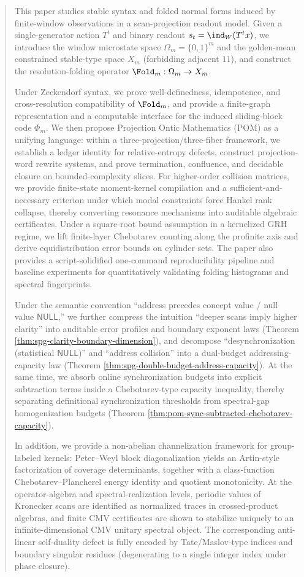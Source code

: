 \begin{abstract}
This paper studies stable syntax and folded normal forms induced by finite-window observations in a scan-projection readout model. Given a single-generator action \(T^t\) and binary readout \(s_t=\ind_W(T^t x)\), we introduce the window microstate space \(\Omega_m=\{0,1\}^m\) and the golden-mean constrained stable-type space \(X_m\) (forbidding adjacent \(11\)), and construct the resolution-folding operator \(\Fold_m:\Omega_m\to X_m\).

Under Zeckendorf syntax, we prove well-definedness, idempotence, and cross-resolution compatibility of \(\Fold_m\), and provide a finite-graph representation and a computable interface for the induced sliding-block code \(\Phi_m\). We then propose Projection Ontic Mathematics (POM) as a unifying language: within a three-projection/three-fiber framework, we establish a ledger identity for relative-entropy defects, construct projection-word rewrite systems, and prove termination, confluence, and decidable closure on bounded-complexity slices. For higher-order collision matrices, we provide finite-state moment-kernel compilation and a sufficient-and-necessary criterion under which modal constraints force Hankel rank collapse, thereby converting resonance mechanisms into auditable algebraic certificates. Under a square-root bound assumption in a kernelized GRH regime, we lift finite-layer Chebotarev counting along the profinite axis and derive equidistribution error bounds on cylinder sets. The paper also provides a script-solidified one-command reproducibility pipeline and baseline experiments for quantitatively validating folding histograms and spectral fingerprints.

Under the semantic convention ``address precedes concept value / null value \(\mathsf{NULL}\),''
we further compress the intuition ``deeper scans imply higher clarity'' into auditable error profiles and boundary exponent laws (Theorem \ref{thm:spg-clarity-boundary-dimension}), and decompose ``desynchronization (statistical \(\mathsf{NULL}\))'' and ``address collision'' into a dual-budget addressing-capacity law (Theorem \ref{thm:spg-double-budget-address-capacity}). At the same time, we absorb online synchronization budgets into explicit subtraction terms inside a Chebotarev-type capacity inequality, thereby separating definitional synchronization thresholds from spectral-gap homogenization budgets (Theorem \ref{thm:pom-sync-subtracted-chebotarev-capacity}).

In addition, we provide a non-abelian channelization framework for group-labeled kernels: Peter--Weyl block diagonalization yields an Artin-style factorization of coverage determinants, together with a class-function Chebotarev--Plancherel energy identity and quotient monotonicity. At the operator-algebra and spectral-realization levels, periodic values of Kronecker scans are identified as normalized traces in crossed-product algebras, and finite CMV certificates are shown to stabilize uniquely to an infinite-dimensional CMV unitary spectral object. The corresponding anti-linear self-duality defect is fully encoded by Tate/Maslov-type indices and boundary singular residues (degenerating to a single integer index under phase closure).


\end{abstract}
